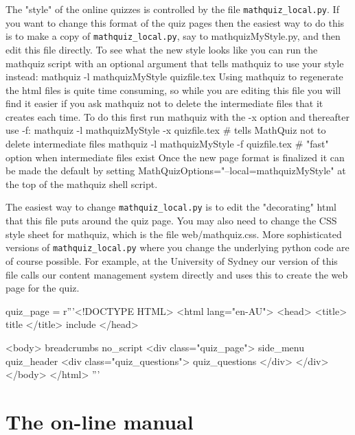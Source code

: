 \documentclass[svgnames]{article}
\begin{document}
  The "style" of the online quizzes is controlled by the file
  \verb!mathquiz_local.py!. If you want to change this format of the quiz
  pages then the easiest way to do this is to make a copy of
  \verb!mathquiz_local.py!, say to mathquizMyStyle.py, and then edit this file
  directly. To see what the new style looks like you can run the
  mathquiz script with an optional argument that tells mathquiz to use
  your style instead: mathquiz -l mathquizMyStyle quizfile.tex Using
  mathquiz to regenerate the html files is quite time consuming, so
  while you are editing this file you will find it easier if you ask
  mathquiz not to delete the intermediate files that it creates each
  time. To do this first run mathquiz with the -x option and thereafter
  use -f: mathquiz -l mathquizMyStyle -x quizfile.tex   \# tells
  MathQuiz not to delete intermediate files mathquiz -l mathquizMyStyle
  -f quizfile.tex   \# "fast" option when intermediate files exist Once
  the new page format is finalized it can be made the default by setting
  MathQuizOptions="--local=mathquizMyStyle" at the top of the mathquiz
  shell script.

  The easiest way to change \verb!mathquiz_local.py! is to edit the
  "decorating" html that this file puts around the quiz page. You may
  also need to change the CSS style sheet for mathquiz, which is the file
  web/mathquiz.css. More sophisticated versions of \verb!mathquiz_local.py!
  where you change the underlying python code are of course possible.
  For example, at the University of Sydney our version of this file
  calls our content management system directly and uses this to create
  the web page for the quiz.

\begin{htmlcode}
    quiz_page = r'''<!DOCTYPE HTML>
    <html lang="en-AU">
    <head>
      <title> {title} </title>
      {include}
    </head>

    <body>
      {breadcrumbs}
      {no_script}
      <div class="quiz_page">
        {side_menu}
        {quiz_header}
        <div class="quiz_questions">
          {quiz_questions}
        </div>
      </div>
    </body>
    </html>
    '''
\end{htmlcode}




  \section{The on-line manual}

    
\end{document}
